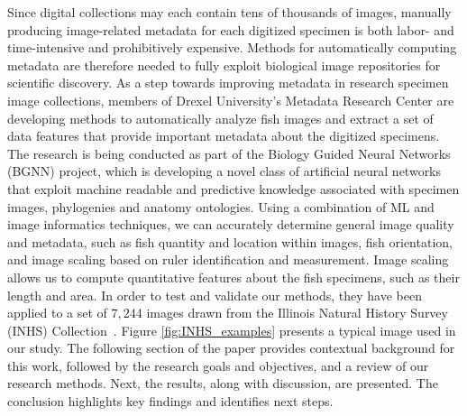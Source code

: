 \documentclass[conference]{IEEEtran}
\begin{document}
Since digital collections may each contain tens of thousands of images, manually producing image-related metadata for each digitized specimen is both labor- and time-intensive and prohibitively expensive. Methods for automatically computing metadata are therefore needed to fully exploit biological image repositories for scientific discovery.
As a step towards improving metadata in research specimen image collections, members of Drexel University's Metadata Research Center are developing methods to automatically analyze fish images and
extract a set of data features that provide important metadata about the
digitized specimens.
The research is being conducted as part of the Biology Guided Neural Networks (BGNN) project, which is developing a novel class of artificial neural networks that exploit machine readable and predictive knowledge associated with specimen images, phylogenies and anatomy ontologies.
Using a combination of ML and image informatics 
techniques,
we can accurately determine general image quality and metadata, such as fish quantity and location within images, fish orientation, and
image scaling based on ruler identification and measurement. Image scaling
allows us to compute quantitative features about the fish specimens, such
as their length and area.  In order to test and validate our methods, they
have been  applied to a set of \(7,244\)
images drawn from the Illinois Natural History Survey (INHS) Collection~\cite{INHS}.
Figure \ref{fig:INHS_examples} presents a typical image used in our
study.
The following section of the paper provides contextual background for this work, followed by the research goals and objectives, and a review of our research methods. Next, the results, along with discussion, are presented. The conclusion highlights key findings and identifies next steps.
\end{document}
